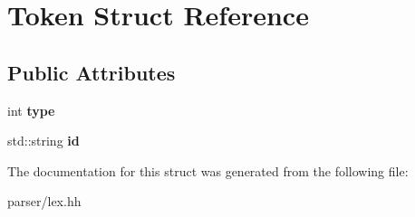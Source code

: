 \hypertarget{structToken}{}\section{Token Struct Reference}
\label{structToken}
\subsection*{Public Attributes}
\begin{DoxyCompactItemize}
\item 
\mbox{\label{structToken_ae46b6b806df89709a13a14dc76c86623}} 
int {\bfseries type}
\item 
\mbox{\label{structToken_ad33f7b8823fd038a97eda64de901fd1c}} 
std\+::string {\bfseries id}
\end{DoxyCompactItemize}


The documentation for this struct was generated from the following file\+:\begin{DoxyCompactItemize}
\item 
parser/lex.\+hh\end{DoxyCompactItemize}
